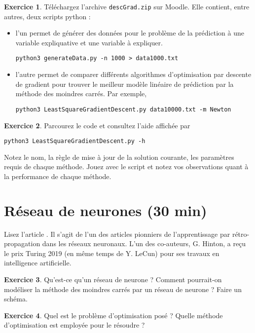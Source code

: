 \documentclass[a4paper,francais]{article}
\theoremstyle{definition}
\newtheorem{exercice}{Exercice}[section]
\begin{document}
\begin{exercice}
Téléchargez l'archive \texttt{descGrad.zip} sur Moodle. Elle contient, entre autres, deux scripts python :
\begin{itemize}
\item
  l'un permet de générer des données pour le problème de la prédiction à une variable expliquative
  et une variable à expliquer.
\begin{verbatim}
python3 generateData.py -n 1000 > data1000.txt
\end{verbatim}
\item l'autre permet de comparer différents algorithmes d'optimisation par descente de gradient
  pour trouver le meilleur modèle linéaire de prédiction par la méthode des moindres carrés.
  Par exemple,  
\begin{verbatim}
python3 LeastSquareGradientDescent.py data10000.txt -m Newton 
\end{verbatim}
\end{itemize}
\end{exercice}

\begin{exercice}
Parcourez le code et consultez l'aide affichée par
\begin{verbatim}
python3 LeastSquareGradientDescent.py -h 
\end{verbatim}
Notez le nom, la règle de mise à jour de la solution courante,
les paramètres requis de chaque méthode. Jouez avec le script et
notez vos observations quant à la performance de chaque méthode.  
\end{exercice}

\section{Réseau de neurones (30 min)}

Lisez l'article \cite{hinton86}. Il s'agit de l'un des articles pionniers
de l'apprentissage par rétro-propagation dans les réseaux neuronaux. L'un des
co-auteurs, G. Hinton, a reçu le prix Turing 2019 (en même temps de Y. LeCun)
pour ses travaux en intelligence artificielle.  

\begin{exercice}
Qu'est-ce qu'un réseau de neurone ? Comment pourrait-on modéliser
la méthode des moindres carrés par un réseau de neurone ? Faire un schéma. 
\end{exercice}

\begin{exercice}
Quel est le problème d'optimisation posé ?
Quelle méthode d'optimisation est employée pour le résoudre ?
\end{exercice}



\end{document}
